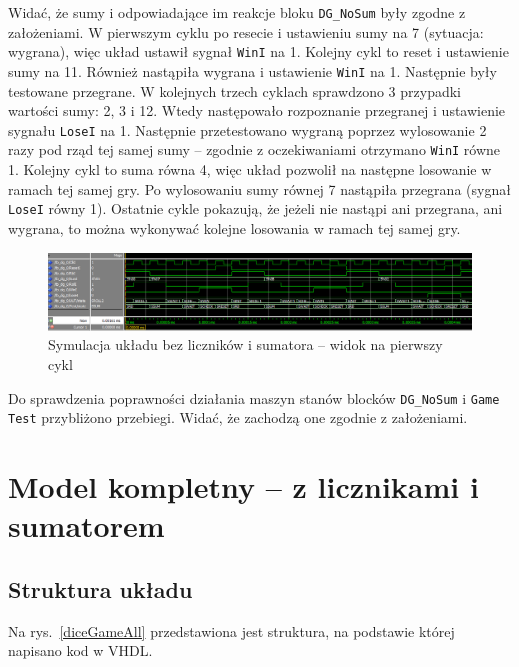 \documentclass[a4paper,11pt,fleqn]{article}
\begin{document}
Widać, że sumy i odpowiadające im reakcje bloku \texttt{DG\_NoSum} były zgodne z założeniami. W pierwszym cyklu po resecie i ustawieniu sumy na 7 (sytuacja: wygrana), więc układ ustawił sygnał \texttt{WinI} na 1. Kolejny cykl to reset i ustawienie sumy na 11. Również nastąpiła wygrana i ustawienie \texttt{WinI} na 1. Następnie były testowane przegrane. W kolejnych trzech cyklach sprawdzono 3 przypadki wartości sumy: 2, 3 i 12. Wtedy następowało rozpoznanie przegranej i ustawienie sygnału \texttt{LoseI} na 1. Następnie przetestowano wygraną poprzez wylosowanie 2 razy pod rząd tej samej sumy -- zgodnie z oczekiwaniami otrzymano \texttt{WinI} równe 1. Kolejny cykl to suma równa 4, więc układ pozwolił na następne losowanie w ramach tej samej gry. Po wylosowaniu sumy równej 7 nastąpiła przegrana (sygnał \texttt{LoseI} równy 1). Ostatnie cykle pokazują, że jeżeli nie nastąpi ani przegrana, ani wygrana, to można wykonywać kolejne losowania w ramach tej samej gry.


\begin{figure}[h]
\centering
\includegraphics[scale = 0.35]{screens/tb_dg_0_2.png}
\caption{Symulacja układu bez liczników i sumatora -- widok na pierwszy cykl}
\label{tb_dg_0_2}
\end{figure}

Do sprawdzenia poprawności działania maszyn stanów blocków \texttt{DG\_NoSum} i \texttt{Game Test} przybliżono przebiegi. Widać, że zachodzą one zgodnie z założeniami.

\section{Model kompletny -- z licznikami i sumatorem}

\subsection{Struktura układu}

Na rys.~\ref{diceGameAll} przedstawiona jest struktura, na podstawie której napisano kod w VHDL. 
\end{document}
